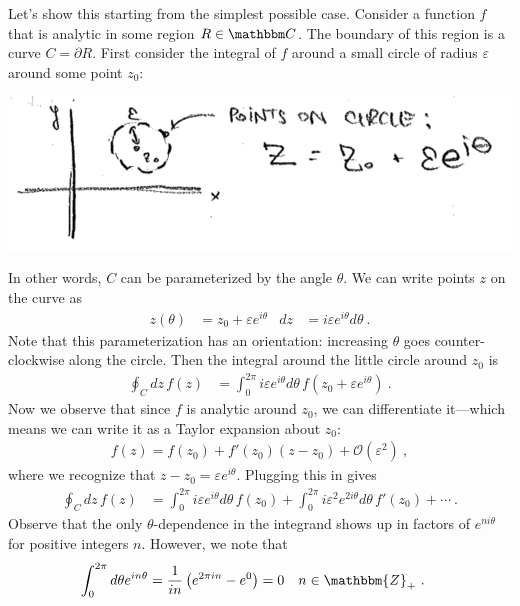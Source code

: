 \documentclass[
  11pt,
	colorful,
	raggedright,
]{tufte-style-thesis-flip}
\begin{document}
Let's show this starting from the simplest possible case. Consider a function $f$ that is analytic in some region $R\in \mathbbm C$. The boundary of this region is a curve $C = \partial R$. First consider the integral of $f$ around a small circle of radius $\varepsilon$ around some point $z_0$:
\begin{center}
\includegraphics[width=.7\textwidth]{figures/Lec_2017_12_circle.png}
\end{center}
In other words, $C$ can be parameterized by the angle $\theta$. We can write points $z$ on the curve as
\begin{align}
  z(\theta) &= z_0 + \varepsilon e^{i\theta} 
  &
  dz &= i \varepsilon e^{i\theta} d\theta \ .
\end{align}
Note that this parameterization has an orientation: increasing $\theta$ goes counter-clockwise along the circle.
Then the integral around the little circle around $z_0$ is
\begin{align}
  \oint_C dz\, f(z) &= \int_0^{2\pi} i \varepsilon e^{i\theta} d\theta \, f\left( z_0 + \varepsilon e^{i\theta} \right) \ .
\end{align}
Now we observe that since $f$ is analytic around $z_0$, we can differentiate it---which means we can write it as a Taylor expansion about $z_0$:
\begin{align}
  f(z)
   = f(z_0) + f'(z_0)(z-z_0) + \mathcal O(\varepsilon^2) \ ,
\end{align}
where we recognize that $z-z_0 = \varepsilon e^{i\theta}$. Plugging this in gives
\begin{align}
  \oint_C dz\, f(z) &= 
  \int_0^{2\pi} i \varepsilon e^{i\theta} d\theta \, f(z_0) 
  +
  \int_0^{2\pi} i \varepsilon^2 e^{2i\theta} d\theta \, f'(z_0) 
  + \cdots
  \ .
\end{align}
Observe that the only $\theta$-dependence in the integrand shows up in factors of $e^{n i\theta}$ for positive integers $n$. However, we note that
\begin{align}
  \int_0^{2\pi} d\theta e^{in\theta} 
  &= 
  \frac{1}{in} \left(e^{2\pi i n} - e^{0}\right)
  = 0 
  &
  n &\in \mathbbm{Z}_+
  \ .
  \label{eq:complex:theta:integral:trivial}
\end{align}
\end{document}
